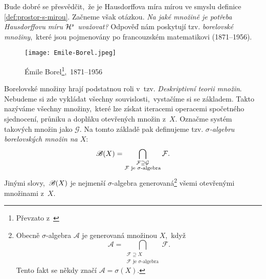 Bude dobré se přesvědčit,~že je Hausdorffova míra mírou ve smyslu definice \ref{def:prostor-s-mirou}. Začneme však otázkou. \emph{Na jaké množině je potřeba Hausdorffovu míru $\mathcal{H}^{s}$ uvažovat?} Odpověď nám poskytují tzv. \emph{borelovské množiny},~které jsou pojmenovány po francouzském matematikovi  (1871--1956).
\begin{figure}[h]
    \centering
    \texttt{[image: Emile-Borel.jpeg]}
    \caption[Émile Borel,~1871--1956]{Émile Borel\footnote{Převzato z~\cite{OConnorBorel2025}},~1871--1956}
\end{figure}
Borelovské množiny hrají podstatnou roli v~tzv. \emph{Deskriptivní teorii množin}. Nebudeme si zde vykládat všechny souvislosti,~vystačíme si se základem. Takto nazýváme všechny množiny,~které lze získat iteracemi operacemi spočetného sjednocení, průniku a doplňku otevřených množin z~$X$. Označme systém takových množin jako $\mathcal{G}$. Na tomto základě pak definujeme tzv. \emph{$\sigma$-algebru borelovských množin na $X$}:
\[\mathscr{B}(X)=\bigcap_{\substack{\mathcal{F}\supseteq\mathcal{G}\\\text{$\mathcal{F}$ je $\sigma$-algebra}}}\mathcal{F}.\]
Jinými slovy,~$\mathscr{B}(X)$ je nejmenší $\sigma$-algebra generovaná\footnote{Obecně $\sigma$-algebra $\mathcal{A}$ je generovaná množinou $X$,~když
\[\mathcal{A}=\bigcap_{\substack{\mathcal{F}\supseteq X\\\text{$\mathcal{F}$ je $\sigma$-algebra}}}\mathcal{F}.\]
Tento fakt se někdy značí $\mathcal{A}=\sigma(X)$.} všemi otevřenými množinami z~$X$.

